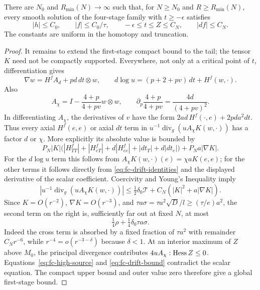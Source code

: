 \begin{proposition}
\label{prop:fc-bounded-range}
There are $N_0$ and $R_{\min}(N)\to\infty$ such that, for
$N\ge N_0$ and $R\ge R_{\min}(N)$, every smooth solution of the
four-stage family with $t\ge-\epsilon$ satisfies
\[
 |h|\le C_0,\qquad |f|\le C_0/\tau,
 \qquad-\epsilon\le t\le Z\le C_N,
 \qquad |df|\le C_N.
\]
The constants are uniform in the homotopy and truncation.
\end{proposition}

\begin{proof}
It remains to extend the first-stage compact bound to the tail;
the tensor $K$ need not be compactly supported.  Everywhere, not
only at a critical point of $t$, differentiation gives
\begin{equation}\label{eq:fc-drift-identities}
 \nabla w=H^f A_d+p d\,dt\otimes w,
 \qquad
 d\log u=(p+2+pv)\,dt+H^f(w,\cdot).
\end{equation}
Also
\[
 A_\chi=I-\frac{4+p}{4+pv}w\otimes w,
 \qquad
 \partial_p\frac{4+p}{4+pv}=\frac{4d}{(4+pv)^2}.
\]
In differentiating $A_\chi$, the derivatives of $v$ have the form
$2a d\,H^f(\cdot,e)+2p d a^2dt$.  Thus every axial $H^f(e,e)$
or axial $dt$ term in
$u^{-1}\operatorname{div}_g(uA_\chi K(w,\cdot))$ has a factor
$d$ or $\chi$.  More explicitly its absolute value is bounded by
\[
 P_N|K|\bigl(
 |H^f_{TT}|+|H^f_{eT}|+d|H^f_{ee}|
          +|dt_T|+d|dt_e|\bigr)
       +P_Na|\nabla K|.
\]
For the $d\log u$ term this follows from
$A_\chi K(w,\cdot)(e)=\chi aK(e,e)$; for the other terms it
follows directly from \eqref{eq:fc-drift-identities} and the
displayed derivative of the scalar coefficient.  Coercivity and
Young's Inequality imply
\begin{equation}\label{eq:fc-drift-bound}
 \left|u^{-1}\operatorname{div}_g(uA_\chi K(w,\cdot))\right|
 \le\tfrac12\delta_0\mathcal T
                       +C_N(|K|^2+a|\nabla K|).
\end{equation}
Since $K=O(r^{-2})$, $\nabla K=O(r^{-3})$, and
$\tau a\sigma=\tau a^2\sqrt D/l\ge(\tau/e)a^2$, the second
term on the right is, sufficiently far out at fixed $N$, at most
\[
 \tfrac14\rho+\tfrac14\delta_0\tau a\sigma.
\]
Indeed the cross term is absorbed by a fixed fraction of
$\tau a^2$ with remainder $C_Nr^{-6}$, while
$r^{-4}=o(r^{-3-\delta})$ because $\delta<1$.
At an interior maximum of $Z$ above $M_0$, the principal
divergence contributes $4uA_\chi:\operatorname{Hess} Z\le0$.
Equations~\eqref{eq:fc-high-source} and
\eqref{eq:fc-drift-bound} contradict the scalar equation.
The compact upper bound and outer value zero therefore give a
global first-stage bound.


\end{proof}
